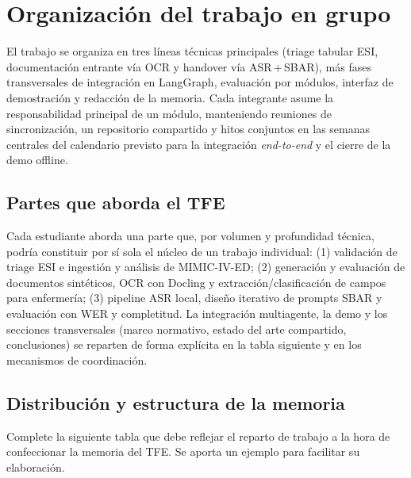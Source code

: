 \section*{Organización del trabajo en grupo}
El trabajo se organiza en tres líneas técnicas principales (triage tabular ESI, documentación entrante vía OCR y handover vía ASR\,+\,SBAR), más fases transversales de integración en LangGraph, evaluación por módulos, interfaz de demostración y redacción de la memoria. Cada integrante asume la responsabilidad principal de un módulo, manteniendo reuniones de sincronización, un repositorio compartido y hitos conjuntos en las semanas centrales del calendario previsto para la integración \emph{end-to-end} y el cierre de la demo offline.

\subsection*{Partes que aborda el TFE}
Cada estudiante aborda una parte que, por volumen y profundidad técnica, podría constituir por sí sola el núcleo de un trabajo individual: (1) validación de triage ESI e ingestión y análisis de MIMIC-IV-ED; (2) generación y evaluación de documentos sintéticos, OCR con Docling y extracción/clasificación de campos para enfermería; (3) pipeline ASR local, diseño iterativo de prompts SBAR y evaluación con WER y completitud. La integración multiagente, la demo y los secciones transversales (marco normativo, estado del arte compartido, conclusiones) se reparten de forma explícita en la tabla siguiente y en los mecanismos de coordinación.

\subsection*{Distribución y estructura de la memoria}
Complete la siguiente tabla que debe reflejar el reparto de trabajo a la hora de confeccionar la memoria del TFE. Se aporta un ejemplo para facilitar su elaboración.

